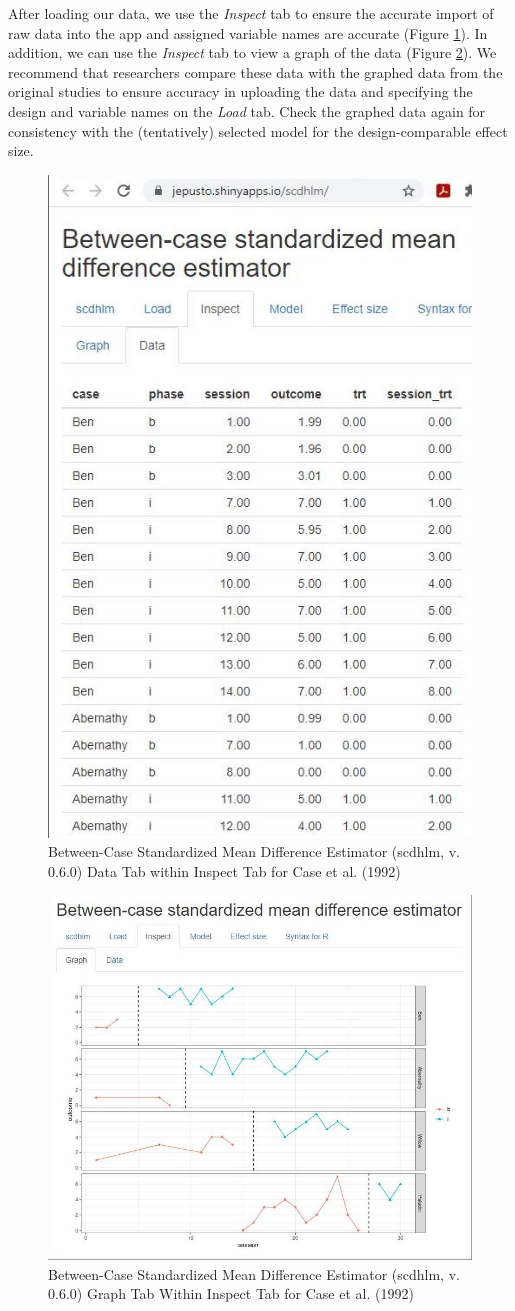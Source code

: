 \documentclass[
]{book}
\begin{document}
After loading our data, we use the \emph{Inspect} tab to ensure the accurate import of raw data into the app and assigned variable names are accurate (Figure \ref{fig:Inspect-Case-1992}). In addition, we can use the \emph{Inspect} tab to view a graph of the data (Figure \ref{fig:Graph-Case-1992}). We recommend that researchers compare these data with the graphed data from the original studies to ensure accuracy in uploading the data and specifying the design and variable names on the \emph{Load} tab. Check the graphed data again for consistency with the (tentatively) selected model for the design-comparable effect size.

\begin{figure}
\includegraphics[width=0.5\linewidth,height=0.75\textheight]{images/app.inspect.data_Case1992} \caption{Between-Case Standardized Mean Difference Estimator (scdhlm, v. 0.6.0) Data Tab within Inspect Tab for Case et al. (1992)}\label{fig:Inspect-Case-1992}
\end{figure}

\begin{figure}
\includegraphics[width=0.75\linewidth]{images/app.inspect.graph_Case1992} \caption{Between-Case Standardized Mean Difference Estimator (scdhlm, v. 0.6.0) Graph Tab Within Inspect Tab for Case et al. (1992)}\label{fig:Graph-Case-1992}
\end{figure}
\end{document}
